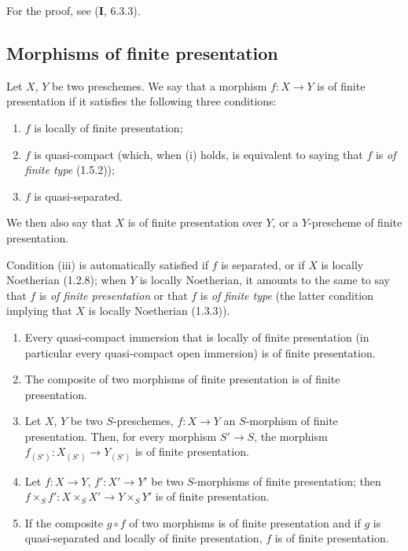 For the proof, see (\textbf{I}, 6.3.3).

\subsection{Morphisms of finite presentation}
\label{subsection:IV.1.6}

\begin{definition}[1.6.1]
\label{IV.1.6.1}
Let $X$, $Y$ be two preschemes. We say that a morphism $f:X\to Y$ is
of finite presentation if it satisfies the following three conditions:
\begin{enumerate}
  \item[\textup{(i)}] $f$ is locally of finite presentation;
  \item[\textup{(ii)}] $f$ is quasi-compact \textup{(which, when (i) holds, is equivalent
  to saying that $f$ is \emph{of finite type} (1.5.2))};
  \item[\textup{(iii)}] $f$ is quasi-separated.
\end{enumerate}
We then also say that $X$ is of finite presentation over $Y$, or a
$Y$-prescheme of finite presentation.
\end{definition}

Condition (iii) is automatically satisfied if $f$ is separated, or if $X$
is locally Noetherian (1.2.8); when $Y$ is locally Noetherian, it
amounts to the same to say that $f$ is \emph{of finite presentation} or that
$f$ is \emph{of finite type} (the latter condition implying that $X$ is
locally Noetherian (1.3.3)).


\begin{proposition}[1.6.2]
\label{IV.1.6.2}
\begin{enumerate}
  \item[\textup{(i)}] Every quasi-compact immersion that is locally of finite
  presentation (in particular every quasi-compact open immersion) is of
  finite presentation.
  \item[\textup{(ii)}] The composite of two morphisms of finite presentation is of
  finite presentation.
  \item[\textup{(iii)}] Let $X$, $Y$ be two $S$-preschemes, $f:X\to Y$ an
  $S$-morphism of finite presentation. Then, for every morphism $S'\to S$,
  the morphism $f_{(S')}:X_{(S')}\to Y_{(S')}$ is of finite presentation.
  \item[\textup{(iv)}] Let $f:X\to Y$, $f':X'\to Y'$ be two $S$-morphisms of finite
  presentation; then
  $f\times_Sf':X\times_SX'\to Y\times_SY'$ is of finite presentation.
  \item[\textup{(v)}] If the composite $g\circ f$ of two morphisms is of finite
  presentation and if $g$ is quasi-separated and locally of finite
  presentation, $f$ is of finite presentation.
\end{enumerate}
\end{proposition}

